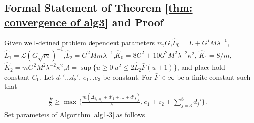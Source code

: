 \documentclass[twoside]{article} %
\theoremstyle{plain}
\theoremstyle{definition}
\theoremstyle{remark}
\newcommand{\hL}{\hat{L}}
\newcommand{\fL}{\mathcal{L}}
\begin{document}
\subsection{Formal Statement of Theorem \ref{thm: convergence of alg3} and Proof}\label{Appendix: Convergence of Algorithm 3}
Given well-defined problem dependent parameters $m$,$G$,$\hL_0=L+G^2M\lambda^{-1}$,$\hL_1=\fL(G\sqrt{m})^{-1}$,$\hL_2=G^2Mm\lambda^{-1}$,$\hat{K}_0=8G^2+10G^2M^2\lambda^{-2}\kappa^2$, $\hat{K}_1=8/m$, $\hat{K}_2=mG^2M^2\lambda^{-2}\kappa^2$,$\Lambda=\sup\{u\geq 0|u^2\leq2\hL_2\bar{F}(u+1) \}$, and place-hold constant $C_0$.
Let $d_1'\dots d_8'$, $e_1\dots e_3$ be constant. For $\bar{F}<\infty$ be a finite constant such that
\begin{align}
    \frac{\bar{F}}{8}\geq \max\Big\{ \frac{m(\Delta_{\theta_0,\eta_0}+d'_1+\dots+d'_8)}{\delta},e_1+e_2+ \sum_{j=3}^{8}d_j' \Big\} .
\end{align}
Set parameters of Algorithm \ref{alg1-3} as follows
\end{document}
